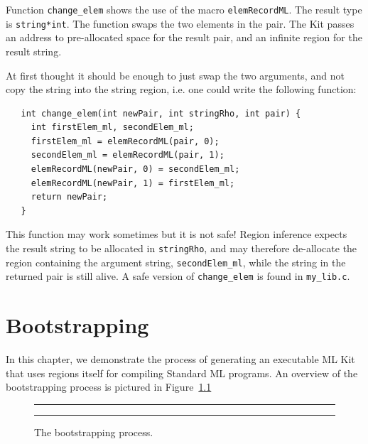 \documentclass[12pt]{book}
\begin{document}
\begin{example}\label{change_elem.ex}
  Function \texttt{change\_elem} shows the use of
  the macro \texttt{elemRecordML}. The result type is \texttt{string*int}. The
  function swaps the two elements in the pair. The Kit passes an address to
  pre-allocated space for the result pair, and an infinite region for the
  result string.
  
  At first thought it should be enough to just swap the two arguments, and
  not copy the string into the string region, i.e. one could write the
  following function:
\begin{verbatim}
   int change_elem(int newPair, int stringRho, int pair) {
     int firstElem_ml, secondElem_ml;
     firstElem_ml = elemRecordML(pair, 0);
     secondElem_ml = elemRecordML(pair, 1);
     elemRecordML(newPair, 0) = secondElem_ml;
     elemRecordML(newPair, 1) = firstElem_ml;
     return newPair;
   }
\end{verbatim}
  This function may work sometimes but it is not safe! Region
  inference expects the result string to be allocated in
  \texttt{stringRho}, and may therefore de-allocate the region containing
  the argument string, \verb|secondElem_ml|, while the string in the
  returned pair is still alive. A safe version of \verb|change_elem| is
  found in \verb|my_lib.c|.
\end{example}

\chapter{Bootstrapping}

In this chapter, we demonstrate the process of generating an
executable ML Kit that uses regions itself for compiling Standard ML
programs. An overview of the bootstrapping process is pictured in
Figure~\ref{bootstrap.fig}

\begin{figure}
\hrule\medskip
\begin{center}
\end{center}
\caption{The bootstrapping process.}
\label{bootstrap.fig}
\medskip\hrule
\end{figure}
\end{document}
